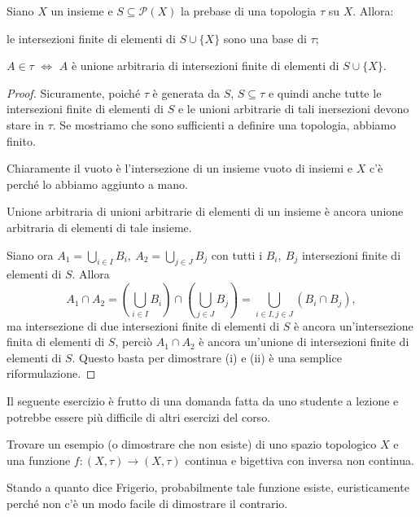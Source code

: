 \documentclass{article}
\begin{document}
\begin{prop}
	Siano $X$ un insieme e $S \subseteq \mathcal{P}(X)$ la prebase di una
	topologia $\tau$ su $X$. Allora:
	\begin{nlist}
		\item le intersezioni finite di elementi di $S \cup \{X\}$ sono una base
		di $\tau$;
		\item $A \in \tau$ $\Leftrightarrow$ $A$ è unione arbitraria di
		intersezioni finite di elementi di $S \cup \{X\}$.
	\end{nlist}
\end{prop}

\begin{proof}
	Sicuramente, poiché $\tau$ è generata da $S$, $S \subseteq \tau$ e quindi
	anche tutte le intersezioni finite di elementi di $S$ e le unioni arbitrarie
	di tali inersezioni devono stare in $\tau$. Se mostriamo che sono
	sufficienti a definire una topologia, abbiamo finito.

    Chiaramente il vuoto è l'intersezione di un insieme vuoto di insiemi e $X$
    c'è perché lo abbiamo aggiunto a mano.

    Unione arbitraria di unioni arbitrarie di elementi di un insieme è ancora
    unione arbitraria di elementi di tale insieme.

    Siano ora $A_1= \bigcup_{i \in I} B_i,\ A_2=\bigcup_{j \in J} B_j$ con tutti
    i $B_i,\ B_j$ intersezioni finite di elementi di $S$. Allora
    $$A_1 \cap A_2 =
    \left( \bigcup_{i \in I} B_i \right) \cap \left(\bigcup_{j \in J} B_j
    \right)= \bigcup_{i \in I, j \in J} (B_i \cap B_j),$$
     ma  intersezione di due intersezioni finite di elementi di $S$ è ancora
     un'intersezione finita di elementi di $S$, perciò $A_1 \cap A_2$ è ancora
     un'unione di intersezioni finite di elementi di $S$. Questo basta per
     dimostrare (i) e (ii) è una semplice riformulazione.
\end{proof}

\begin{exc}
	Il seguente esercizio è frutto di una domanda fatta da uno studente a
	lezione e potrebbe essere più difficile di altri esercizi del corso.

    \marginpar{\warningsign}
	Trovare un esempio (o dimostrare che non esiste) di uno spazio topologico
	$X$ e una funzione $f: (X, \tau) \rightarrow (X, \tau)$ continua e bigettiva
	con inversa non continua.

    Stando a quanto dice Frigerio, probabilmente tale funzione esiste,
    euristicamente perché non c'è un modo facile di dimostrare il contrario.
\end{exc}
\end{document}
